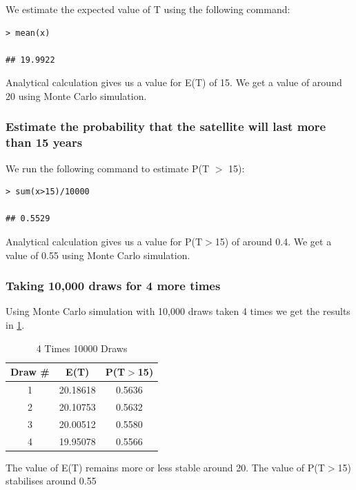 \documentclass[12pt,letterpaper,titlepage,en-US]{article}
\begin{document}
We estimate the expected value of T using the following command:
\begin{knitrout}
\color{fgcolor}
\begin{kframe}
\begin{verbatim}
> mean(x)

## 19.9922
\end{verbatim}
\end{kframe}
\end{knitrout}
Analytical calculation gives us a value for E(T) of 15. We get a value of around 20 using Monte Carlo simulation.

\subsubsection{Estimate the probability that the satellite will last more than 15 years}
We run the following command to estimate P(T $>$ 15):
\begin{knitrout}
\color{fgcolor}
\begin{kframe}

\begin{verbatim}
> sum(x>15)/10000

## 0.5529
\end{verbatim}
\end{kframe}
\end{knitrout}
Analytical calculation gives us a value for P(T$>$15) of around 0.4. We get a value of 0.55 using Monte Carlo simulation.


\subsubsection{Taking 10,000 draws for 4 more times}

Using Monte Carlo simulation with 10,000 draws taken 4 times we get the results in \cref{1}.
\begin{table}[H]
\centering
\begin{tabular}{|c|c|c|}
\hline
Draw \#    &E(T)    & P(T$>$15) \\\hline
1 & 20.18618  &0.5636 \\\hline
2 & 20.10753  &0.5632\\\hline
3 &20.00512  &0.5580\\\hline
4 &19.95078  &0.5566\\\hline
\end{tabular}
\caption{4 Times 10000 Draws}\label{1}
\end{table}
The value of E(T) remains more or less stable around 20. The value of P(T$>$15) stabilises around 0.55
\end{document}
